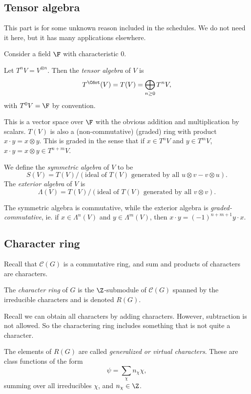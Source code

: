 \documentclass[a4paper]{article}
\begin{document}
\subsection{Tensor algebra}
This part is for some unknown reason included in the schedules. We do not need it here, but it has many applications elsewhere.

Consider a field $\F$ with characteristic $0$.

\begin{defi}
  Let $T^nV = V^{\otimes n}$. Then the \emph{tensor algebra} of $V$ is
  \[
    T^{\Cdot}(V) = T(V) = \bigoplus_{n\geq 0} T^nV,
  \]
  with $T^0V = \F$ by convention.

  This is a vector space over $\F$ with the obvious addition and multiplication by scalars. $T(V)$ is also a (non-commutative) (graded) ring with product $x \cdot y = x\otimes y$. This is graded in the sense that if $x \in T^n V$ and $y \in T^m V$, $x \cdot y = x\otimes y \in T^{n + m}V$.
\end{defi}

\begin{defi}
  We define the \emph{symmetric algebra} of $V$ to be
  \[
    S(V) = T(V) / (\text{ideal of $T(V)$ generated by all $u\otimes v - v\otimes u$}).
  \]
  The \emph{exterior algebra} of $V$ is
  \[
    \Lambda(V) = T(V) / (\text{ideal of $T(V)$ generated by all $v \otimes v$}).
  \]
\end{defi}
The symmetric algebra is commutative, while the exterior algebra is \emph{graded-commutative}, ie. if $x \in \Lambda^n(V)$ and $y \in \Lambda^m(V)$, then $x\cdot y = (-1)^{n + m + 1} y \cdot x$.

\subsection{Character ring}
Recall that $\mathcal{C}(G)$ is a commutative ring, and sum and products of characters are characters.

\begin{defi}
  The \emph{character ring} of $G$ is the $\Z$-submodule of $\mathcal{C}(G)$ spanned by the irreducible characters and is denoted $R(G)$.
\end{defi}
Recall we can obtain all characters by adding characters. However, subtraction is not allowed. So the charactering ring includes something that is not quite a character. %

\begin{defi}
  The elements of $R(G)$ are called \emph{generalized or virtual characters}. These are class functions of the form
  \[
    \psi = \sum_{\chi} n_\chi \chi,
  \]
  summing over all irreducibles $\chi$, and $n_\chi \in \Z$.
\end{defi}
\end{document}

